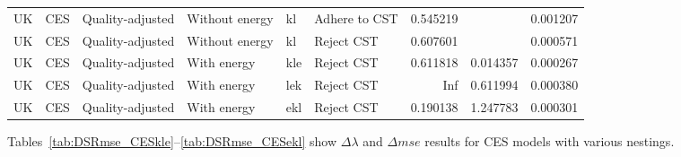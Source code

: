 \documentclass[preprint,authoryear,12pt]{elsarticle}\usepackage[]{graphicx}\usepackage[]{color}
\begin{document}
\begin{table}[ht]
{\begin{tabular}{llllllrrr}
  UK & CES & Quality-adjusted & Without energy & kl & Adhere to CST & 0.545219 &  & 0.001207 \\ 
  UK & CES & Quality-adjusted & Without energy & kl & Reject CST & 0.607601 &  & 0.000571 \\ 
  UK & CES & Quality-adjusted & With energy & kle & Reject CST & 0.611818 & 0.014357 & 0.000267 \\ 
  UK & CES & Quality-adjusted & With energy & lek & Reject CST &     Inf & 0.611994 & 0.000380 \\ 
  UK & CES & Quality-adjusted & With energy & ekl & Reject CST & 0.190138 & 1.247783 & 0.000301 \\ 
   \hline
\end{tabular}
}
\end{table}

%
Tables~\ref{tab:DSRmse_CESkle}--\ref{tab:DSRmse_CESekl} show $\Delta \lambda$ and $\Delta mse$ 
results for CES models with various nestings.
%
\end{document}

